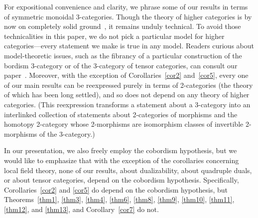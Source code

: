 \documentclass{amsart}
\begin{document}
\begin{remarkohc*}
For expositional convenience and clarity, we phrase some of our results in terms of symmetric monoidal 3-categories.  Though the theory of higher categories is by now on completely solid ground~\cite{luriehtt,lurieinf2,rezkcart,barkan,unicity,MR2742424,simpson,bergrezk,1308.3574}, it remains unduly technical.  To avoid those technicalities in this paper, we do not pick a particular model for higher categories---every statement we make is true in any model.  Readers curious about model-theoretic issues, such as the fibrancy of a particular construction of the bordism 3-category or of the 3-category of tensor categories, can consult our paper~\cite{3TC}.  Moreover, with the exception of Corollaries~\ref{cor2} and~\ref{cor5}, every one of our main results can be reexpressed purely in terms of 2-categories (the theory of which has been long settled), and so does not depend on any theory of higher categories.  (This reexpression transforms a statement about a 3-category into an interlinked collection of statements about 2-categories of morphisms and the homotopy 2-category whose 2-morphisms are isomorphism classes of invertible 2-morphisms of the 3-category.)

In our presentation, we also freely employ the cobordism hypothesis, but we would like to emphasize that with the exception of the corollaries concerning local field theory, none of our results, about dualizability, about quadruple duals, or about tensor categories, depend on the cobordism hypothesis.  Specifically, Corollaries~\ref{cor2} and \ref{cor5} do depend on the cobordism hypothesis, but Theorems~\ref{thm1}, \ref{thm3}, \ref{thm4}, \ref{thm6}, \ref{thm8}, \ref{thm9}, \ref{thm10}, \ref{thm11}, \ref{thm12}, and \ref{thm13}, and Corollary~\ref{cor7} do not.
\end{remarkohc*}
\end{document}
